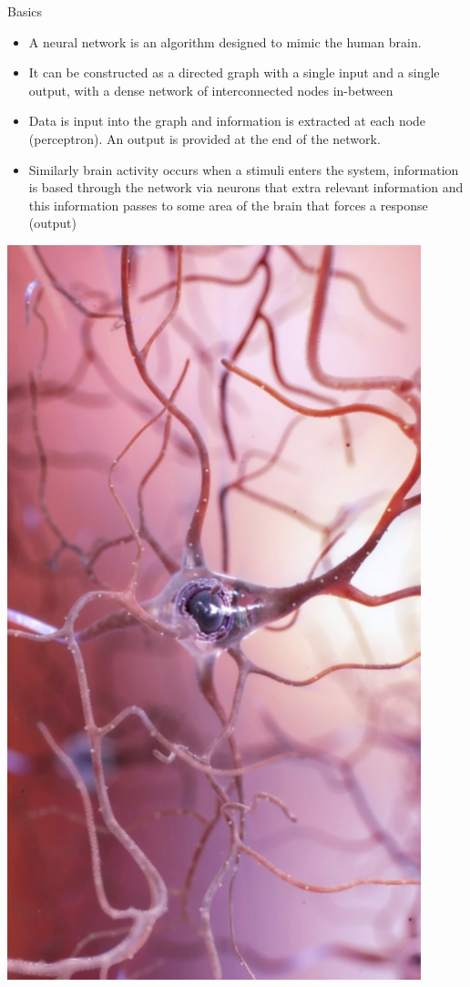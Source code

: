 \documentclass{beamer}
\begin{document}
\begin{frame}{Basics}
\begin{minipage}{0.70\linewidth}
\begin{itemize}
\item A neural network is an algorithm designed to mimic the human brain.
\item It can be constructed as a directed graph with a single input and a single output, with a dense network of interconnected nodes in-between
\item Data is input into the graph and information is extracted at each node (perceptron). An output is provided at the end of the network.
\item Similarly brain activity occurs when a stimuli enters the system, information is based through the network via neurons that extra relevant information and this information passes to some area of the brain that forces a response (output)
\end{itemize}
\end{minipage}
\begin{minipage}{0.29\linewidth}
\includegraphics[width=0.9\textwidth]{Images/neuron.jpg}
\end{minipage}
\end{frame}
\end{document}
